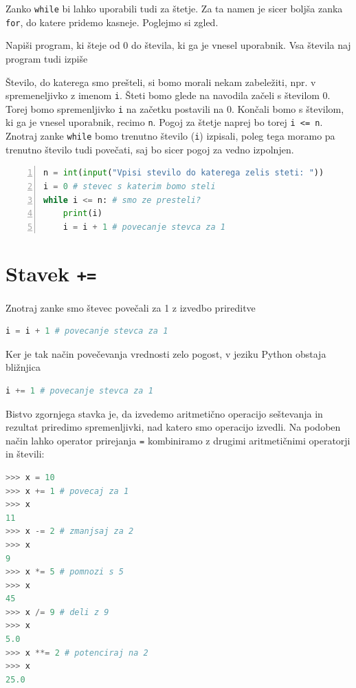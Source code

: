 Zanko \texttt{while} bi lahko uporabili tudi za štetje. Za ta namen je sicer boljša zanka \texttt{for}, do katere pridemo kasneje. Poglejmo si zgled.
\begin{zgled}
Napiši program, ki šteje od 0 do števila, ki ga je vnesel uporabnik. Vsa števila naj program tudi izpiše
\end{zgled}
\begin{resitev}
Število, do katerega smo prešteli, si bomo morali nekam zabeležiti, npr. v spremeneljivko z imenom \texttt{i}. Šteti bomo glede na navodila začeli s številom 0. Torej bomo spremenljivko \texttt{i} na začetku postavili na 0. Končali bomo s številom, ki ga je vnesel uporabnik, recimo \texttt{n}. Pogoj za štetje naprej bo torej \texttt{i <= n}. Znotraj zanke \texttt{while} bomo trenutno število (\texttt{i}) izpisali, poleg tega moramo pa trenutno število tudi povečati, saj bo sicer pogoj za vedno izpolnjen. 
\begin{lstlisting}[language=Python,numbers=left]
n = int(input("Vpisi stevilo do katerega zelis steti: "))
i = 0 # stevec s katerim bomo steli
while i <= n: # smo ze presteli?
    print(i)
    i = i + 1 # povecanje stevca za 1
\end{lstlisting}
\end{resitev}

\section{Stavek \texttt{+=}}
Znotraj zanke smo števec povečali za 1 z izvedbo prireditve
\begin{lstlisting}[language=Python]
i = i + 1 # povecanje stevca za 1
\end{lstlisting}
Ker je tak način povečevanja vrednosti zelo pogost, v jeziku Python obstaja bližnjica
\begin{lstlisting}[language=Python]
i += 1 # povecanje stevca za 1
\end{lstlisting}
Bistvo zgornjega stavka je, da izvedemo aritmetično operacijo seštevanja in rezultat priredimo spremenljivki, nad katero smo operacijo izvedli. Na podoben način lahko operator prirejanja \texttt{=} kombiniramo z drugimi aritmetičnimi operatorji in števili:
\begin{lstlisting}[language=Python]
>>> x = 10
>>> x += 1 # povecaj za 1
>>> x
11
>>> x -= 2 # zmanjsaj za 2
>>> x
9
>>> x *= 5 # pomnozi s 5
>>> x
45
>>> x /= 9 # deli z 9
>>> x
5.0
>>> x **= 2 # potenciraj na 2
>>> x
25.0
\end{lstlisting}

